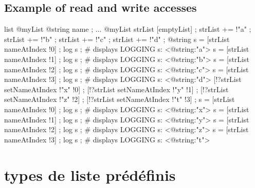 \subsection{Example of read and write accesses}

\begin{galgas}
list @myList {
  @string name ;
}
...
@myList strList [emptyList] ;
strList += !"a" ;
strList += !"b" ;
strList += !"c" ;
strList += !"d" ;
@string s = [strList nameAtIndex !0] ;
log s ; # displays LOGGING s: <@string:"a">
s = [strList nameAtIndex !1] ;
log s ; # displays LOGGING s: <@string:"b">
s = [strList nameAtIndex !2] ;
log s ; # displays LOGGING s: <@string:"c">
s = [strList nameAtIndex !3] ;
log s ; # displays LOGGING s: <@string:"d">
[!?strList setNameAtIndex !"x" !0] ;
[!?strList setNameAtIndex !"y" !1] ;
[!?strList setNameAtIndex !"z" !2] ;
[!?strList setNameAtIndex !"t" !3] ;
s = [strList nameAtIndex !0] ;
log s ; # displays LOGGING s: <@string:"x">
s = [strList nameAtIndex !1] ;
log s ; # displays LOGGING s: <@string:"y">
s = [strList nameAtIndex !2] ;
log s ; # displays LOGGING s: <@string:"z">
s = [strList nameAtIndex !3] ;
log s ; # displays LOGGING s: <@string:"t">
\end{galgas}


\section{types de liste prédéfinis}


















